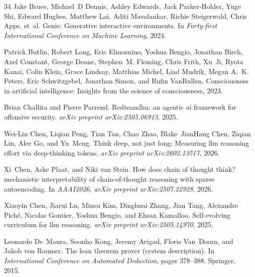 \begin{thebibliography}{34}
Jake Bruce, Michael~D Dennis, Ashley Edwards, Jack Parker-Holder, Yuge Shi, Edward Hughes, Matthew Lai, Aditi Mavalankar, Richie Steigerwald, Chris Apps, et~al.
\newblock Genie: Generative interactive environments.
\newblock In \emph{Forty-first International Conference on Machine Learning}, 2024.

Patrick Butlin, Robert Long, Eric Elmoznino, Yoshua Bengio, Jonathan Birch, Axel Constant, George Deane, Stephen~M. Fleming, Chris Frith, Xu~Ji, Ryota Kanai, Colin Klein, Grace Lindsay, Matthias Michel, Liad Mudrik, Megan A.~K. Peters, Eric Schwitzgebel, Jonathan Simon, and Rufin VanRullen.
\newblock Consciousness in artificial intelligence: Insights from the science of consciousness, 2023.

Brian Challita and Pierre Parrend.
\newblock Redteamllm: an agentic ai framework for offensive security.
\newblock \emph{arXiv preprint arXiv:2505.06913}, 2025.

Wei-Lin Chen, Liqian Peng, Tian Tan, Chao Zhao, Blake~JianHang Chen, Ziqian Lin, Alec Go, and Yu~Meng.
\newblock Think deep, not just long: Measuring llm reasoning effort via deep-thinking tokens.
\newblock \emph{arXiv preprint arXiv:2602.13517}, 2026{}.

Xi~Chen, Aske Plaat, and Niki van Stein.
\newblock How does chain of thought think? mechanistic interpretability of chain-of-thought reasoning with sparse autoencoding.
\newblock In \emph{AAAI2026, arXiv preprint arXiv:2507.22928}, 2026{}.

Xiaoyin Chen, Jiarui Lu, Minsu Kim, Dinghuai Zhang, Jian Tang, Alexandre Pich{\'e}, Nicolas Gontier, Yoshua Bengio, and Ehsan Kamalloo.
\newblock Self-evolving curriculum for llm reasoning.
\newblock \emph{arXiv preprint arXiv:2505.14970}, 2025.

Leonardo De~Moura, Soonho Kong, Jeremy Avigad, Floris Van~Doorn, and Jakob von Raumer.
\newblock The lean theorem prover (system description).
\newblock In \emph{International Conference on Automated Deduction}, pages 378--388. Springer, 2015.


\end{thebibliography}
